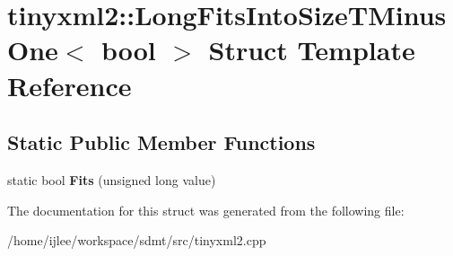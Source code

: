 \hypertarget{structtinyxml2_1_1_long_fits_into_size_t_minus_one}{}\section{tinyxml2\+:\+:Long\+Fits\+Into\+Size\+T\+Minus\+One$<$ bool $>$ Struct Template Reference}
\label{structtinyxml2_1_1_long_fits_into_size_t_minus_one}
\subsection*{Static Public Member Functions}
\begin{DoxyCompactItemize}
\item 
\mbox{\label{structtinyxml2_1_1_long_fits_into_size_t_minus_one_a3057710104ab733963eb32fda0bc374c}} 
static bool {\bfseries Fits} (unsigned long value)
\end{DoxyCompactItemize}


The documentation for this struct was generated from the following file\+:\begin{DoxyCompactItemize}
\item 
/home/ijlee/workspace/sdmt/src/tinyxml2.\+cpp\end{DoxyCompactItemize}
